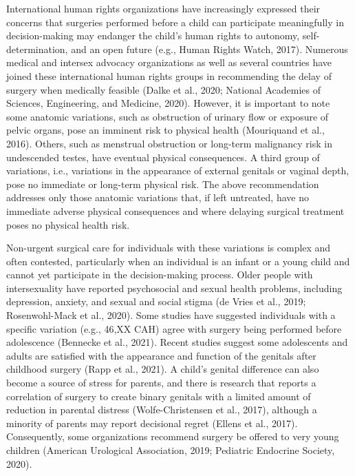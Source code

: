 \documentclass[
]{book}
\begin{document}
International human rights organizations have
increasingly expressed their concerns that surgeries performed before a child can participate
meaningfully in decision-making may endanger
the child's human rights to autonomy,
self-determination, and an open future (e.g.,
Human Rights Watch, 2017). Numerous medical
and intersex advocacy organizations as well as
several countries have joined these international
human rights groups in recommending the delay
of surgery when medically feasible (Dalke et al.,
2020; National Academies of Sciences, Engineering,
and Medicine, 2020). However, it is important to
note some anatomic variations, such as obstruction of urinary flow or exposure of pelvic organs,
pose an imminent risk to physical health
(Mouriquand et al., 2016). Others, such as menstrual obstruction or long-term malignancy risk
in undescended testes, have eventual physical
consequences. A third group of variations, i.e.,
variations in the appearance of external genitals
or vaginal depth, pose no immediate or long-term
physical risk. The above recommendation
addresses only those anatomic variations that, if
left untreated, have no immediate adverse physical consequences and where delaying surgical
treatment poses no physical health risk.

Non-urgent surgical care for individuals with
these variations is complex and often contested,
particularly when an individual is an infant or a
young child and cannot yet participate in the
decision-making process. Older people with intersexuality have reported psychosocial and sexual
health problems, including depression, anxiety,
and sexual and social stigma (de Vries et al.,
2019; Rosenwohl-Mack et al., 2020). Some studies
have suggested individuals with a specific variation (e.g., 46,XX CAH) agree with surgery being
performed before adolescence (Bennecke et al.,
2021). Recent studies suggest some adolescents
and adults are satisfied with the appearance and
function of the genitals after childhood surgery
(Rapp et al., 2021). A child's genital difference
can also become a source of stress for parents,
and there is research that reports a correlation
of surgery to create binary genitals with a limited
amount of reduction in parental distress
(Wolfe-Christensen et al., 2017), although a
minority of parents may report decisional regret
(Ellens et al., 2017). Consequently, some organizations recommend surgery be offered to very
young children (American Urological Association,
2019; Pediatric Endocrine Society, 2020).
\end{document}
